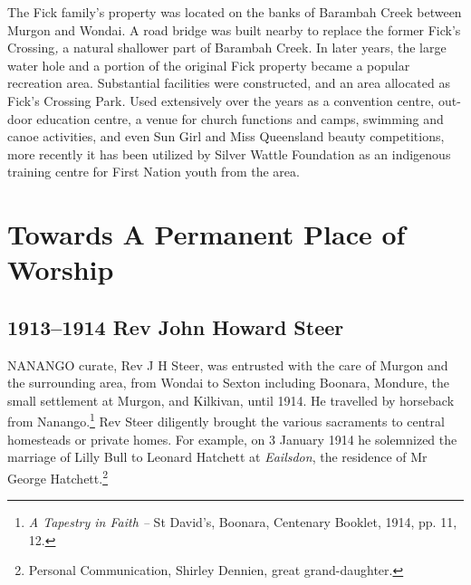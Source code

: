 The Fick family's property was located on the banks of Barambah Creek between Murgon and Wondai. A road bridge was built nearby to replace the former Fick's Crossing\emph{,} a natural shallower part of Barambah Creek. In later years, the large water hole and a portion of the original Fick property became a popular recreation area. Substantial facilities were constructed, and an area allocated as Fick's Crossing Park\emph{.} Used extensively over the years as a convention centre, out-door education centre, a venue for church functions and camps, swimming and canoe activities, and even Sun Girl and Miss Queensland beauty competitions, more recently it has been utilized by Silver Wattle Foundation as an indigenous training centre for First Nation youth from the area.



\balance


\printendnotes[custom]
\setcounter{endnote}{0}
\chapter{Towards A Permanent Place of Worship}
\nobalance


\section{1913--1914 Rev John Howard Steer}



\lettrine[lines=3]{N}{ANANGO}
 curate, Rev J H Steer, was entrusted with the care of Murgon and the surrounding area, from Wondai to Sexton including Boonara, Mondure, the small settlement at Murgon, and Kilkivan, until 1914. He travelled by horseback from Nanango.\footnote{\emph{A Tapestry in Faith --} St David's, Boonara, Centenary Booklet, 1914, pp. 11, 12.} Rev Steer diligently brought the various sacraments to central homesteads or private homes. For example, on 3 January 1914 he solemnized the marriage of Lilly Bull to Leonard Hatchett at \emph{Eailsdon}, the residence of Mr George Hatchett.\footnote{Personal Communication, Shirley Dennien, great grand-daughter.}







